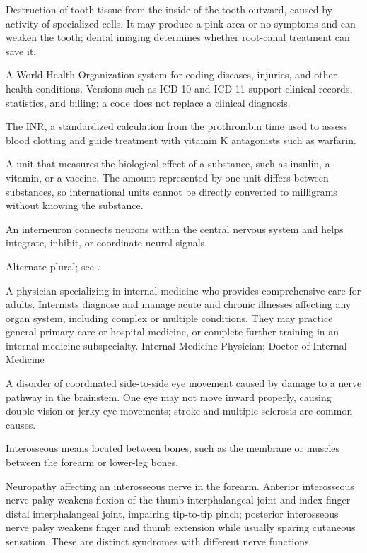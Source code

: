  Destruction of tooth tissue from the inside of the tooth outward, caused by activity of specialized cells. It may produce a pink area or no symptoms and can weaken the tooth; dental imaging determines whether root-canal treatment can save it.

 A World Health Organization system for coding diseases, injuries, and other health conditions. Versions such as ICD-10 and ICD-11 support clinical records, statistics, and billing; a code does not replace a clinical diagnosis.

 The INR, a standardized calculation from the prothrombin time used to assess blood clotting and guide treatment with vitamin K antagonists such as warfarin.

 A unit that measures the biological effect of a substance, such as insulin, a vitamin, or a vaccine. The amount represented by one unit differs between substances, so international units cannot be directly converted to milligrams without knowing the substance.

 An interneuron connects neurons within the central nervous system and helps integrate, inhibit, or coordinate neural signals.

 Alternate plural; see .

 A physician specializing in internal medicine who provides comprehensive care for adults.
Internists diagnose and manage acute and chronic illnesses affecting any organ system,
including complex or multiple conditions. They may practice general primary care or hospital
medicine, or complete further training in an internal-medicine subspecialty.
\synonyms
Internal Medicine Physician; Doctor of Internal Medicine

 A disorder of coordinated side-to-side eye movement caused by damage to a nerve pathway in the brainstem. One eye may not move inward properly, causing double vision or jerky eye movements; stroke and multiple sclerosis are common causes.

 Interosseous means located between bones, such as the membrane or muscles between the forearm or lower-leg bones.

 Neuropathy affecting an interosseous nerve in the
forearm. Anterior interosseous nerve palsy weakens flexion of the thumb interphalangeal
joint and index-finger distal interphalangeal joint, impairing tip-to-tip pinch; posterior
interosseous nerve palsy weakens finger and thumb extension while usually sparing cutaneous
sensation. These are distinct syndromes with different nerve functions.

